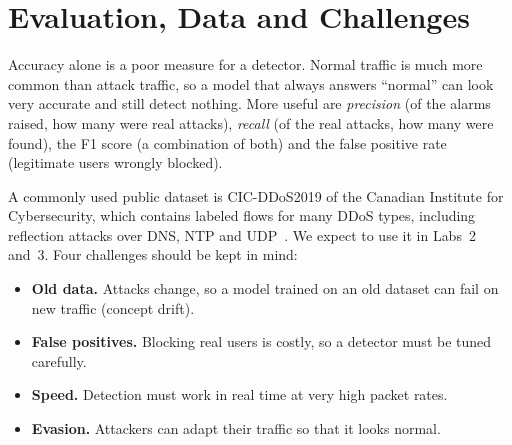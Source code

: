 \section{Evaluation, Data and Challenges}

Accuracy alone is a poor measure for a detector. Normal traffic is much more common than attack traffic, so a model that always answers \enquote{normal} can look very accurate and still detect nothing. More useful are \emph{precision} (of the alarms raised, how many were real attacks), \emph{recall} (of the real attacks, how many were found), the F1 score (a combination of both) and the false positive rate (legitimate users wrongly blocked).

A commonly used public dataset is CIC-DDoS2019 of the Canadian Institute for Cybersecurity, which contains labeled flows for many DDoS types, including reflection attacks over DNS, NTP and UDP~\cite{cicddos}. We expect to use it in Labs~2 and~3. Four challenges should be kept in mind:

\begin{itemize}
	\item \textbf{Old data.} Attacks change, so a model trained on an old dataset can fail on new traffic (concept drift).
	\item \textbf{False positives.} Blocking real users is costly, so a detector must be tuned carefully.
	\item \textbf{Speed.} Detection must work in real time at very high packet rates.
	\item \textbf{Evasion.} Attackers can adapt their traffic so that it looks normal.
\end{itemize}

